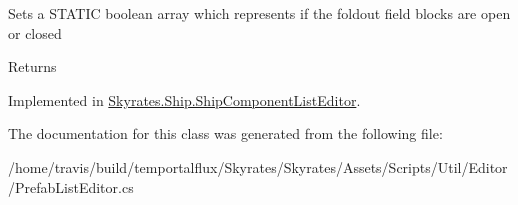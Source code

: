 Sets a S\-T\-A\-T\-I\-C boolean array which represents if the foldout field blocks are open or closed 

\begin{DoxyReturn}{Returns}

\end{DoxyReturn}


Implemented in \hyperlink{class_skyrates_1_1_ship_1_1_ship_component_list_editor_a3fd87a0b9c93edce8d116866ef269170}{Skyrates.\-Ship.\-Ship\-Component\-List\-Editor}.



The documentation for this class was generated from the following file\-:\begin{DoxyCompactItemize}
\item 
/home/travis/build/temportalflux/\-Skyrates/\-Skyrates/\-Assets/\-Scripts/\-Util/\-Editor/Prefab\-List\-Editor.\-cs\end{DoxyCompactItemize}

